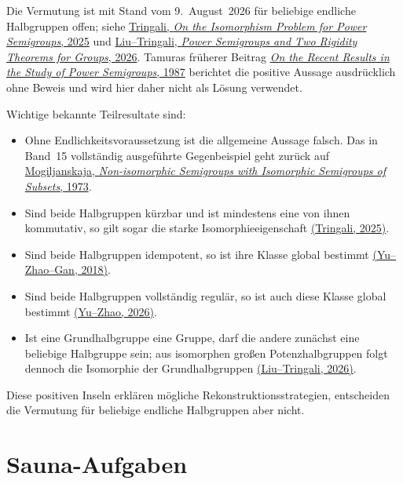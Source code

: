 \documentclass[main.tex]{subfiles}
\begin{document}
\begin{remark}
Die Vermutung ist mit Stand vom 9.~August~2026 für beliebige endliche
Halbgruppen offen; siehe
\href{https://doi.org/10.1007/978-3-031-75326-8_20}%
  {Tringali, \emph{On the Isomorphism Problem for Power Semigroups}, 2025}
und
\href{https://doi.org/10.48550/arXiv.2606.01917}%
  {Liu--Tringali, \emph{Power Semigroups and Two Rigidity Theorems for
  Groups}, 2026}.
Tamuras früherer Beitrag
\href{https://doi.org/10.1007/978-94-009-3839-7_22}%
  {\emph{On the Recent Results in the Study of Power Semigroups}, 1987}
berichtet die positive Aussage ausdrücklich ohne Beweis und wird hier daher
nicht als Lösung verwendet.

Wichtige bekannte Teilresultate sind:
\begin{itemize}
  \item Ohne Endlichkeitsvoraussetzung ist die allgemeine Aussage falsch.
    Das in Band~15 vollständig ausgeführte Gegenbeispiel geht zurück auf
    \href{https://doi.org/10.1007/BF02389140}%
      {Mogiljanskaja, \emph{Non-isomorphic Semigroups with Isomorphic
      Semigroups of Subsets}, 1973}.
  \item Sind beide Halbgruppen kürzbar und ist mindestens eine von ihnen
    kommutativ, so gilt sogar die starke Isomorphieeigenschaft
    \href{https://doi.org/10.1007/978-3-031-75326-8_20}%
      {(Tringali, 2025)}.
  \item Sind beide Halbgruppen idempotent, so ist ihre Klasse global bestimmt
    \href{https://doi.org/10.1080/00927872.2017.1319474}%
      {(Yu--Zhao--Gan, 2018)}.
  \item Sind beide Halbgruppen vollständig regulär, so ist auch diese Klasse
    global bestimmt
    \href{https://doi.org/10.1080/00927872.2026.2659846}%
      {(Yu--Zhao, 2026)}.
  \item Ist eine Grundhalbgruppe eine Gruppe, darf die andere zunächst eine
    beliebige Halbgruppe sein; aus isomorphen großen Potenzhalbgruppen folgt
    dennoch die Isomorphie der Grundhalbgruppen
    \href{https://doi.org/10.48550/arXiv.2606.01917}%
      {(Liu--Tringali, 2026)}.
\end{itemize}
Diese positiven Inseln erklären mögliche Rekonstruktionsstrategien, entscheiden
die Vermutung für beliebige endliche Halbgruppen aber nicht.
\end{remark}


\chapter{Sauna-Aufgaben}
\end{document}
